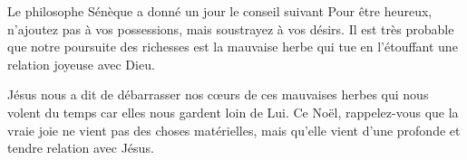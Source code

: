 Le philosophe Sénèque a donné un jour le conseil suivant\frcolon{}
\Og Pour être heureux, n'ajoutez pas à vos possessions, mais soustrayez à vos désirs. \Fg{} Il est très probable que notre poursuite des richesses est la mauvaise herbe qui tue en l'étouffant une relation joyeuse avec Dieu.


Jésus nous a dit de débarrasser nos cœurs de ces mauvaises herbes qui nous volent du temps car elles nous gardent loin de Lui. Ce Noël, rappelez-vous que la vraie joie ne vient pas des choses matérielles, mais qu'elle vient d'une profonde et tendre relation avec Jésus.

\begin{dvquotes}

\end{dvquotes}

